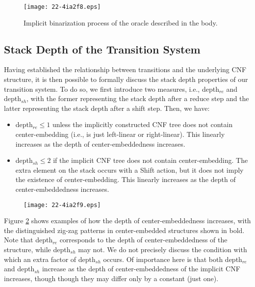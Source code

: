\documentclass[english]{jnlp_1.4}
\begin{document}
\begin{figure}[b]
\begin{center}
\texttt{[image: 22-4ia2f8.eps]}
\end{center}
\caption{Implicit binarization process of the oracle described in the body.}
\label{fig:binarize}
\end{figure}


\subsection{Stack Depth of the Transition System}
\label{sec:memorycost}

Having established the relationship between transitions and the underlying CNF structure, it is then possible to formally discuss the stack depth properties of our transition system.
To do so, we first introduce two measures, i.e., depth$_{re}$ and depth$_{sh}$, with the former representing the stack depth after a reduce step and the latter representing the stack depth after a shift step.
Then, we have:
\begin{itemize}
 \item depth$_{re} \leq 1$ unless the implicitly constructed CNF tree does not contain center-embedding (i.e., is just left-linear or right-linear).
       This linearly increases as the depth of center-embeddedness increases.
 \item depth$_{sh} \leq 2$ if the implicit CNF tree does not contain center-embedding.
       The extra element on the stack occurs with a {\sc Shift} action, but it does not imply the existence of center-embedding.
       This linearly increases as the depth of center-embeddedness increases.
\end{itemize}

\begin{figure}[b]
\begin{center}
\texttt{[image: 22-4ia2f9.eps]}
\end{center}
\label{fig:level}
\end{figure}

Figure \ref{fig:level} shows examples of how the depth of center-embeddedness increases, with the distinguished zig-zag patterns in center-embedded structures shown in bold.
Note that depth$_{re}$ corresponds to the depth of center-embeddedness of the structure, while depth$_{sh}$ may not.
We do not precisely discuss the condition with which an extra factor of depth$_{sh}$ occurs.
Of importance here is that both depth$_{re}$ and depth$_{sh}$ increase as the depth of center-embeddedness of the implicit CNF increases, though though they may differ only by a constant (just one).
\end{document}
